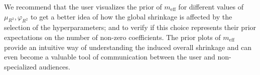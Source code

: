 We recommend that the user visualizes the prior of $m_{\text{eff}}$ for different values of $\mu_{R^2}, \varphi_{R^2}$ to get a better idea of how the global shrinkage is affected by the selection of the hyperparameters; and to verify if this choice represents their prior expectations on the number of non-zero coefficients. The prior plots of $m_{\text{eff}}$ provide an intuitive way of understanding the induced overall shrinkage and can even become a valuable tool of communication between the user and non-specialized audiences.
